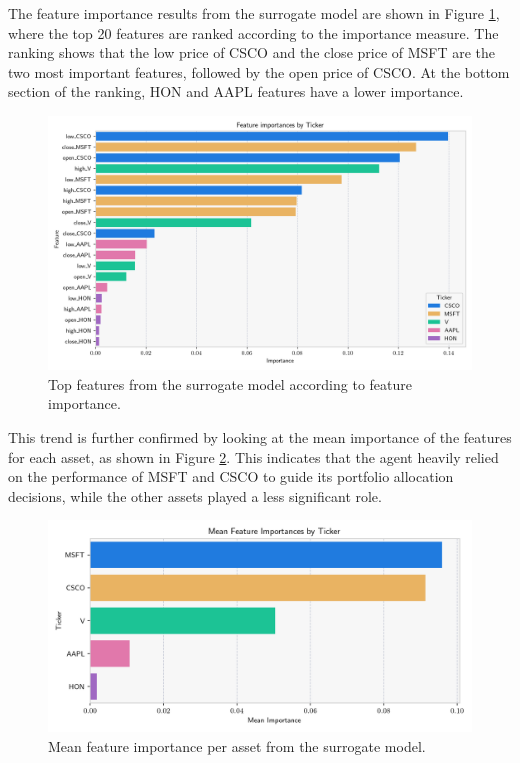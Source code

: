 The feature importance results from the surrogate model are shown in Figure \ref{fig:feature_importance_top_features}, where the top 20 features are ranked according to the importance measure. The ranking shows that the low price of CSCO and the close price of MSFT are the two most important features, followed by the open price of CSCO. At the bottom section of the ranking, HON and AAPL features have a lower importance.

\begin{figure}
    \centering
    \includegraphics[width=\textwidth]{figures/feature_importance_top_features.png}
    \caption{Top features from the surrogate model according to feature importance.}
    \label{fig:feature_importance_top_features}
\end{figure}

This trend is further confirmed by looking at the mean importance of the features for each asset, as shown in Figure \ref{fig:mean_feature_importance_by_asset}. This indicates that the agent heavily relied on the performance of MSFT and CSCO to guide its portfolio allocation decisions, while the other assets played a less significant role. 

\begin{figure}
    \centering
    \includegraphics[width=\textwidth]{figures/feature_importance_mean_ticker.png}
    \caption{Mean feature importance per asset from the surrogate model.}
    \label{fig:mean_feature_importance_by_asset}
\end{figure}

